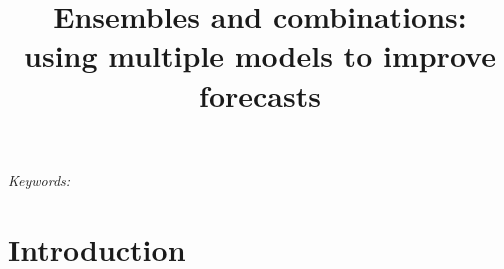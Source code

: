 \documentclass[11pt]{article}
\begin{document}
\def\spacingset#1{\renewcommand{\baselinestretch}%
{#1}\small\normalsize} \spacingset{1.5}

\title{\bf Ensembles and combinations: \\using multiple models to improve forecasts}

\maketitle

\bigskip
\begin{abstract}

\end{abstract}

\noindent%
{\it Keywords:}
\vfill

\bigskip

\spacingset{1.5}

\section{Introduction}
\label{sec:introduction}



\end{document}
